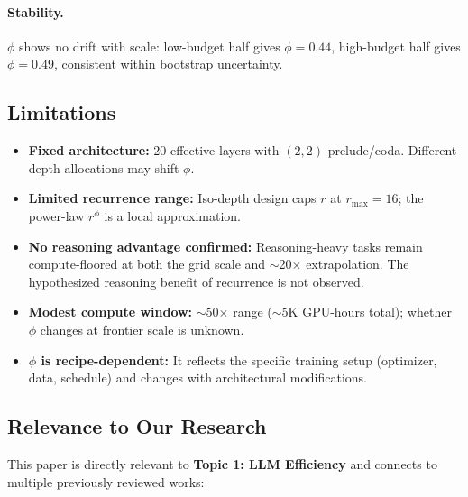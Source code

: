 \documentclass[11pt]{article}
\begin{document}
\paragraph{Stability.}
$\phi$ shows no drift with scale: low-budget half gives $\phi = 0.44$, high-budget half gives $\phi = 0.49$, consistent within bootstrap uncertainty.

\subsection{Limitations}

\begin{itemize}
    \item \textbf{Fixed architecture:} 20 effective layers with $(2, 2)$ prelude/coda. Different depth allocations may shift $\phi$.
    \item \textbf{Limited recurrence range:} Iso-depth design caps $r$ at $r_{\max} = 16$; the power-law $r^\phi$ is a local approximation.
    \item \textbf{No reasoning advantage confirmed:} Reasoning-heavy tasks remain compute-floored at both the grid scale and $\sim$20$\times$ extrapolation. The hypothesized reasoning benefit of recurrence is not observed.
    \item \textbf{Modest compute window:} $\sim$50$\times$ range ($\sim$5K GPU-hours total); whether $\phi$ changes at frontier scale is unknown.
    \item \textbf{$\phi$ is recipe-dependent:} It reflects the specific training setup (optimizer, data, schedule) and changes with architectural modifications.
\end{itemize}

\subsection{Relevance to Our Research}

This paper is directly relevant to \textbf{Topic 1: LLM Efficiency} and connects to multiple previously reviewed works:
\end{document}
